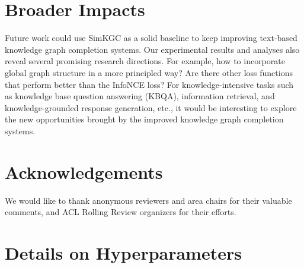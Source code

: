 \documentclass[11pt]{article}
\begin{document}
\section{Broader Impacts}
Future work could use SimKGC as a solid baseline
to keep improving text-based knowledge graph completion systems.
Our experimental results and analyses also reveal several promising research directions.
For example,
how to incorporate global graph structure in a more principled way?
Are there other loss functions that perform better than the InfoNCE loss?
For knowledge-intensive tasks such as knowledge base question answering (KBQA),
information retrieval, and knowledge-grounded response generation, etc.,
it would be interesting to explore the new opportunities
brought by the improved knowledge graph completion systems.

\section*{Acknowledgements}
We would like to thank anonymous reviewers and area chairs for their valuable comments,
and ACL Rolling Review organizers for their efforts.




\appendix

\section{Details on Hyperparameters} ~\label{app:setup}

\begin{table}[ht]
\centering
{}
\caption{Shared hyperparameters for our proposed SimKGC model.}
\label{tab:appendix_hyper}
\end{table}
\end{document}
